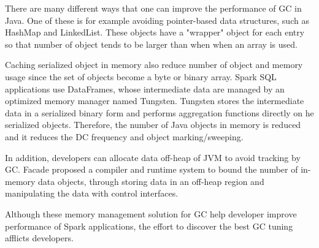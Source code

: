 There are many different ways that one can improve the performance of GC in Java. One of these is for example avoiding pointer-based data structures, such as HashMap and LinkedList. 
These objects have a "wrapper" object for each entry so that number of object tends to be larger than when when an array is used.

Caching serialized object in memory also reduce number of object and memory usage since the set of objects become a byte or binary array. 
Spark SQL applications use DataFrames\cite{DBLP:conf/sigmod/ArmbrustXLHLBMK15}, 
whose intermediate data are managed by an optimized memory manager named Tungsten.
Tungsten stores the intermediate data in a serialized binary form and performs aggregation functions directly on he serialized objects.
Therefore, the number of Java objects in memory is reduced and it reduces the DC frequency and object marking/sweeping. 

In addition, developers can allocate data off-heap of JVM to avoid tracking by GC. 
Facade\cite{DBLP:conf/asplos/NguyenWBFHX15} proposed a compiler and runtime system to bound the number of in-memory data objects, through storing data in an off-heap region and 
manipulating the data with control interfaces.

Although these memory management solution for GC help developer improve performance of Spark applications, 
the effort to discover the best GC tuning afflicts developers.